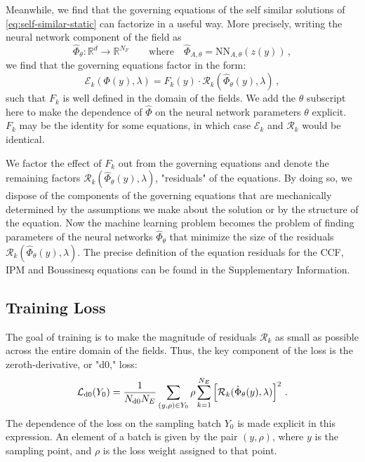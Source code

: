 \documentclass[fleqn,11pt]{wlscirep}
\begin{document}
Meanwhile, we find that the governing equations of the self similar solutions of \cref{eq:self-similar-static} can factorize in a useful way. More precisely, writing the neural network component of the field as
\begin{equation}
    \hat{\Phi}_\theta: \mathbb{R}^d \rightarrow \mathbb{R}^{N_F} \qquad
    \text{where} \quad
    \hat{\Phi}_{A,\theta} = \text{NN}_{A,\theta} (z(y)) \,,
\end{equation}
we find that the governing equations factor in the form:
\begin{equation}
    \mathcal{E}_k (\Phi(y), \lambda) = F_k(y) \cdot \mathcal{R}_k (\hat{\Phi}_\theta(y), \lambda) \,,
\end{equation}
such that $F_k$ is well defined in the domain of the fields. We add the $\theta$ subscript here to make the dependence of $\hat{\Phi}$ on the neural network parameters $\theta$ explicit. $F_k$ may be the identity for some equations, in which case $\mathcal{E}_k$ and $\mathcal{R}_k$ would be identical.

We factor the effect of $F_k$ out from the governing equations and denote the remaining factors $\mathcal{R}_k (\hat{\Phi}_\theta(y), \lambda)$, "residuals" of the equations. By doing so, we dispose of the components of the governing equations that are mechanically determined by the assumptions we make about the solution or by the structure of the equation. Now the machine learning problem becomes the problem of finding parameters of the neural networks $\hat{\Phi}_\theta$ that minimize the size of the residuals $\mathcal{R}_k (\hat{\Phi}_\theta(y), \lambda)$. The precise definition of the equation residuals for the CCF, IPM and Boussinesq equations can be found in the Supplementary Information.

\subsection*{Training Loss}
The goal of training is to make the magnitude of residuals $\mathcal{R}_k$ as small as possible across the entire domain of the fields. Thus, the key component of the loss is the zeroth-derivative, or "d0," loss:
\begin{equation}
    \mathcal{L}_\text{d0} (Y_0) = {1 \over N_\text{d0} N_E} \sum_{(y, \rho) \in Y_0} \rho \sum_{k=1}^{N_E} \left[ \mathcal{R}_k(\hat{\Phi}_\theta(y), \lambda) \right]^2\,.
\end{equation}
The dependence of the loss on the sampling batch $Y_0$ is made explicit in this expression. An element of a batch is given by the pair $(y, \rho)$, where $y$ is the sampling point, and $\rho$ is the loss weight assigned to that point.
\end{document}
